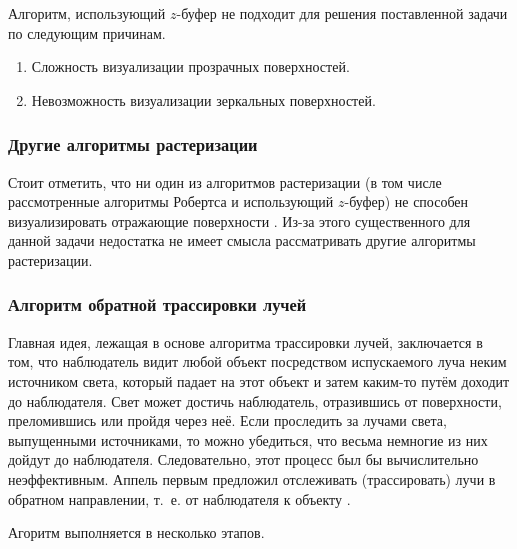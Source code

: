 Алгоритм, использующий $z$-буфер не подходит для решения поставленной задачи по следующим причинам.

\begin{enumerate}[label=\arabic*)]
	\item Сложность визуализации прозрачных поверхностей.
	\item Невозможность визуализации зеркальных поверхностей.
\end{enumerate}

\subsubsection{Другие алгоритмы растеризации}
Стоит отметить, что ни один из алгоритмов растеризации (в том числе рассмотренные алгоритмы Робертса и использующий $z$-буфер) не способен визуализировать отражающие поверхности \cite{rodgers}. Из-за этого существенного для данной задачи недостатка не имеет смысла рассматривать другие алгоритмы растеризации.
\subsubsection{Алгоритм обратной трассировки лучей}

Главная идея, лежащая в основе алгоритма трассировки лучей, заключается в том, что наблюдатель видит любой объект посредством испускаемого луча неким источником света, который падает на этот объект и затем каким-то путём доходит до наблюдателя. Свет может достичь наблюдатель, отразившись от поверхности, преломившись или пройдя через неё. Если проследить за лучами света, выпущенными источниками, то можно убедиться, что весьма немногие из них дойдут до наблюдателя. Следовательно, этот процесс был бы вычислительно неэффективным. Аппель первым предложил отслеживать (трассировать) лучи в обратном направлении, т.~е. от наблюдателя к объекту \cite{rodgers}.

Агоритм выполняется в несколько этапов.

